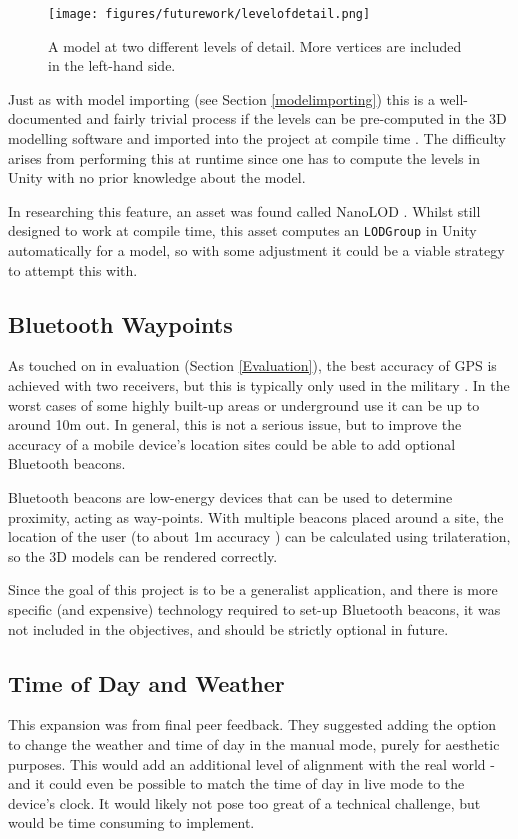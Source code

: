 \documentclass{article}
\begin{document}
\begin{figure}
\centering
    \texttt{[image: figures/futurework/levelofdetail.png]}
        \caption{A model at two different levels of detail. More vertices are included in the left-hand side. \cite{futurework:levelofdetail}}
        \label{fig:levelofdetail}
\end{figure}

Just as with model importing (see Section \ref{modelimporting}) this is a well-documented and fairly trivial process if the levels can be pre-computed in the 3D modelling software and imported into the project at compile time \cite{futurework:levelofdetail} \cite{futurework:LODbrackeys}. The difficulty arises from performing this at runtime since one has to compute the levels in Unity with no prior knowledge about the model.

In researching this feature, an asset was found called NanoLOD \cite{futurework:nanoLOD}. Whilst still designed to work at compile time, this asset computes an \verb|LODGroup| in Unity automatically for a model, so with some adjustment it could be a viable strategy to attempt this with. 

\subsection{Bluetooth Waypoints}
As touched on in evaluation (Section \ref{Evaluation}), the best accuracy of GPS is achieved with two receivers, but this is typically only used in the military \cite{futurework:gpsaccuracy}. In the worst cases of some highly built-up areas or underground use it can be up to around 10m out. In general, this is not a serious issue, but to improve the accuracy of a mobile device's location sites could be able to add optional Bluetooth beacons. 

Bluetooth beacons are low-energy devices that can be used to determine proximity, acting as way-points. With multiple beacons placed around a site, the location of the user (to about 1m accuracy \cite{futurework:beaconaccuracy}) can be calculated using trilateration, so the 3D models can be rendered correctly.  

Since the goal of this project is to be a generalist application, and there is more specific (and expensive) technology required to set-up Bluetooth beacons, it was not included in the objectives, and should be strictly optional in future.

\subsection{Time of Day and Weather}
This expansion was from final peer feedback. They suggested adding the option to change the weather and time of day in the manual mode, purely for aesthetic purposes. This would add an additional level of alignment with the real world - and it could even be possible to match the time of day in live mode to the device's clock. It would likely not pose too great of a technical challenge, but would be time consuming to implement.
\end{document}
